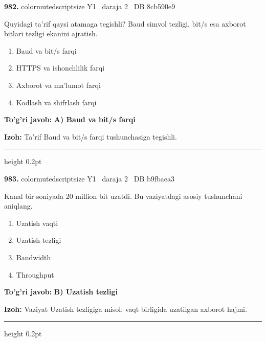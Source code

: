 \documentclass[10pt,a4paper,oneside]{article}
\begin{document}
\noindent\textbf{\color{ink}982.}  {color{muted}scriptsize Y1 \textbullet\ daraja 2 \textbullet\ DB 8cb590e9}
\par
Quyidagi ta'rif qaysi atamaga tegishli? Baud simvol tezligi, bit/s esa axborot bitlari tezligi ekanini ajratish.
\begin{enumerate}[label=\Alph*),leftmargin=9mm]
\item Baud va bit/s farqi
\item HTTPS va ishonchlilik farqi
\item Axborot va ma'lumot farqi
\item Kodlash va shifrlash farqi
\end{enumerate}
\begin{tcolorbox}[enhanced,breakable,colback=teal!4,colframe=teal!50!black,boxrule=0.5pt,arc=1.1mm,left=3mm,right=3mm,top=1.7mm,bottom=1.7mm,before skip=2mm,after skip=2mm]
\textbf{\color{teal}To'g'ri javob:} \textbf{A) Baud va bit/s farqi}
\par\smallskip
\textbf{Izoh:} Ta'rif Baud va bit/s farqi tushunchasiga tegishli.
\end{tcolorbox}
\vspace{2mm}\hrule height 0.2pt \vspace{3mm}

\noindent\textbf{\color{ink}983.}  {color{muted}scriptsize Y1 \textbullet\ daraja 2 \textbullet\ DB b9fbaea3}
\par
Kanal bir soniyada 20 million bit uzatdi. Bu vaziyatdagi asosiy tushunchani aniqlang.
\begin{enumerate}[label=\Alph*),leftmargin=9mm]
\item Uzatish vaqti
\item Uzatish tezligi
\item Bandwidth
\item Throughput
\end{enumerate}
\begin{tcolorbox}[enhanced,breakable,colback=teal!4,colframe=teal!50!black,boxrule=0.5pt,arc=1.1mm,left=3mm,right=3mm,top=1.7mm,bottom=1.7mm,before skip=2mm,after skip=2mm]
\textbf{\color{teal}To'g'ri javob:} \textbf{B) Uzatish tezligi}
\par\smallskip
\textbf{Izoh:} Vaziyat Uzatish tezligiga misol: vaqt birligida uzatilgan axborot hajmi.
\end{tcolorbox}
\vspace{2mm}\hrule height 0.2pt \vspace{3mm}
\end{document}
